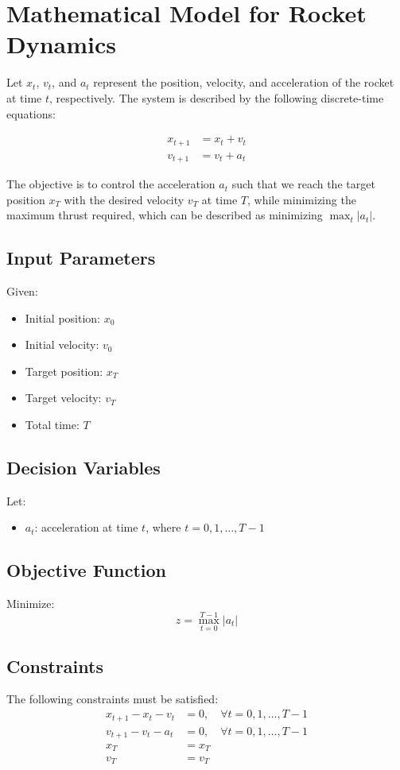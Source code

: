 \documentclass{article}
\begin{document}
\section*{Mathematical Model for Rocket Dynamics}

Let \( x_t \), \( v_t \), and \( a_t \) represent the position, velocity, and acceleration of the rocket at time \( t \), respectively. The system is described by the following discrete-time equations:

\begin{align}
    x_{t+1} & = x_t + v_t \\
    v_{t+1} & = v_t + a_t
\end{align}

The objective is to control the acceleration \( a_t \) such that we reach the target position \( x_T \) with the desired velocity \( v_T \) at time \( T \), while minimizing the maximum thrust required, which can be described as minimizing \( \max_{t} |a_t| \).

\subsection*{Input Parameters}
Given:
\begin{itemize}
    \item Initial position: \( x_0 \)
    \item Initial velocity: \( v_0 \)
    \item Target position: \( x_T \)
    \item Target velocity: \( v_T \)
    \item Total time: \( T \)
\end{itemize}

\subsection*{Decision Variables}
Let:
\begin{itemize}
    \item \( a_t \): acceleration at time \( t \), where \( t = 0, 1, \ldots, T-1 \)
\end{itemize}

\subsection*{Objective Function}
Minimize:
\[
z = \max_{t=0}^{T-1} |a_t|
\]

\subsection*{Constraints}
The following constraints must be satisfied:
\begin{align}
    x_{t+1} - x_t - v_t & = 0, \quad \forall t = 0, 1, \ldots, T-1 \\
    v_{t+1} - v_t - a_t & = 0, \quad \forall t = 0, 1, \ldots, T-1 \\
    x_T & = x_T \\
    v_T & = v_T 
\end{align}
\end{document}
